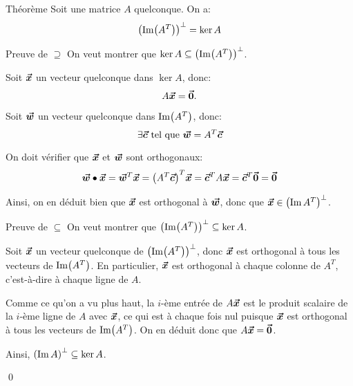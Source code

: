 \documentclass[a4paper]{article}
\begin{document}
\begin{parag}{Théorème}
    Soit une matrice $A$ quelconque. On a:
    \[\left(\im\left(A^T\right)\right)^{\perp} = \ker A\]

    \begin{subparag}{Preuve de $\supseteq$}
        On veut montrer que $\ker A \subseteq \left(\im\left(A^T\right)\right)^{\perp}$.

        \vspace{1em}

        Soit $\bm{\protect\vec{x}}$ un vecteur quelconque dans $\ker A$, donc:
        \[A \bm{\protect\vec{x}} = \bm{\protect\vec{0}}.\]

        Soit $\bm{\protect\vec{w}}$ un vecteur quelconque dans $\im\left(A^T\right)$, donc:
        \[\exists \bm{\protect\vec{c}} \text{ tel que } \bm{\protect\vec{w}} = A^T \bm{\protect\vec{c}}\]

        On doit vérifier que $\bm{\protect\vec{x}}$ et $\bm{\protect\vec{w}}$ sont orthogonaux:
        \[\bvec{w} \dotprod \bvec{x} = \bvec{w}^T \bvec{x} = \left(A^T \bvec{c}\right)^T \bvec{x} = \bvec{c}^T A \bvec{x} = \bvec{c}^T \bvec{0} = \bvec{0}\]

        Ainsi, on en déduit bien que $\bm{\protect\vec{x}}$ est orthogonal à $\bm{\protect\vec{w}}$, donc que $\bvec{x} \in \left(\im A^T\right)^\perp$.
    \end{subparag}

    \begin{subparag}{Preuve de $\subseteq$}
        On veut montrer que $\left(\im\left(A^T\right)\right)^{\perp} \subseteq \ker A $.

        \vspace{1em}

        Soit $\bm{\protect\vec{x}}$ un vecteur quelconque de $\left(\im\left(A^T\right)\right)^\perp$, donc $\bm{\protect\vec{x}}$ est orthogonal à tous les vecteurs de $\im\left(A^T\right)$. En particulier, $\bm{\protect\vec{x}}$ est orthogonal à chaque colonne de $A^T$, c'est-à-dire à chaque ligne de $A$.

        Comme ce qu'on a vu plus haut, la $i$-ème entrée de $A \bm{\protect\vec{x}}$ est le produit scalaire de la $i$-ème ligne de $A$ avec $\bm{\protect\vec{x}}$, ce qui est à chaque fois nul puisque $\bm{\protect\vec{x}}$ est orthogonal à tous les vecteurs de $\im\left(A^T\right)$. On en déduit donc que $A \bm{\protect\vec{x}} = \bm{\protect\vec{0}}$.

        Ainsi, $\left(\im A\right)^\perp \subseteq \ker A$.

        \qed
    \end{subparag}
\end{parag}
\end{document}
